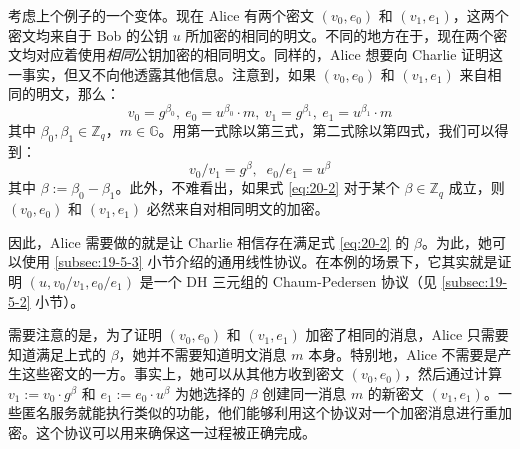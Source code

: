 \begin{example}[明文相等2]
考虑上个例子的一个变体。现在 Alice 有两个密文 $(v_0,e_0)$ 和 $(v_1,e_1)$，这两个密文均来自于 Bob 的公钥 $u$ 所加密的相同的明文。不同的地方在于，现在两个密文均对应着使用\emph{相同}公钥加密的相同明文。同样的，Alice 想要向 Charlie 证明这一事实，但又不向他透露其他信息。注意到，如果 $(v_0,e_0)$ 和 $(v_1,e_1)$ 来自相同的明文，那么：
\[
v_0 =g^{\beta_0},\ 
e_0 =u^{\beta_0}·m,\ 
v_1 =g^{\beta_1},\ 
e_1 =u^{\beta_1}·m
\]
其中 $\beta_0,\beta_1\in\mathbb{Z}_q$，$m\in\mathbb{G}$。用第一式除以第三式，第二式除以第四式，我们可以得到：
\begin{equation}\label{eq:20-2}
{v_0}/{v_1}=g^\beta,\;\;
{e_0}/{e_1}=u^\beta
\end{equation}
其中 $\beta:=\beta_0-\beta_1$。此外，不难看出，如果式 \ref{eq:20-2} 对于某个 $\beta\in\mathbb{Z}_q$ 成立，则 $(v_0,e_0)$ 和 $(v_1,e_1)$ 必然来自对相同明文的加密。

因此，Alice 需要做的就是让 Charlie 相信存在满足式 \ref{eq:20-2} 的 $\beta$。为此，她可以使用 \ref{subsec:19-5-3} 小节介绍的通用线性协议。在本例的场景下，它其实就是证明 $(u,{v_0}/{v_1},{e_0}/{e_1})$ 是一个 DH 三元组的 Chaum-Pedersen 协议（见 \ref{subsec:19-5-2} 小节）。

需要注意的是，为了证明 $(v_0,e_0)$ 和 $(v_1,e_1)$ 加密了相同的消息，Alice 只需要知道满足上式的 $\beta$，她并不需要知道明文消息 $m$ 本身。特别地，Alice 不需要是产生这些密文的一方。事实上，她可以从其他方收到密文 $(v_0,e_0)$，然后通过计算 $v_1:=v_0\cdot g^\beta$ 和 $e_1:=e_0\cdot u^\beta$ 为她选择的 $\beta$ 创建同一消息 $m$ 的新密文 $(v_1,e_1)$。一些匿名服务就能执行类似的功能，他们能够利用这个协议对一个加密消息进行重加密。这个协议可以用来确保这一过程被正确完成。
\end{example}

